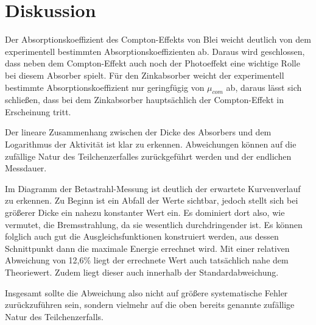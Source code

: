 \section{Diskussion}
\label{sec:Diskussion}

Der Absorptionskoeffizient des Compton-Effekts von Blei weicht deutlich von dem experimentell bestimmten Absorptionskoeffizienten ab.
Daraus wird geschlossen, dass neben dem Compton-Effekt auch noch der Photoeffekt eine wichtige Rolle bei diesem Absorber spielt. Für
den Zinkabsorber weicht der experimentell bestimmte Absorptionskoeffizient nur geringfügig von $\mu_{com}$ ab, daraus
lässt sich schließen, dass bei dem Zinkabsorber hauptsächlich der Compton-Effekt in Erscheinung tritt.

Der lineare Zusammenhang zwischen der Dicke des Absorbers und dem Logarithmus der Aktivität ist klar zu erkennen.
Abweichungen können auf die zufällige Natur des Teilchenzerfalles zurückgeführt werden und der endlichen Messdauer.

Im Diagramm der Betastrahl-Messung ist deutlich der erwartete Kurvenverlauf zu erkennen. Zu Beginn ist ein Abfall der
Werte sichtbar, jedoch stellt sich bei größerer Dicke ein nahezu konstanter Wert ein. Es dominiert dort also, wie vermutet, die Bremsstrahlung, da
sie wesentlich durchdringender ist. Es können folglich auch gut die Ausgleichsfunktionen konstruiert werden, aus dessen Schnittpunkt
dann die maximale Energie errechnet wird. Mit einer relativen Abweichung von 12,6\% liegt der errechnete Wert auch tatsächlich nahe dem
Theoriewert. Zudem liegt dieser auch innerhalb der Standardabweichung.

Insgesamt sollte die Abweichung also nicht auf größere systematische Fehler zurückzuführen sein, sondern vielmehr auf die oben bereits genannte
zufällige Natur des Teilchenzerfalls.
